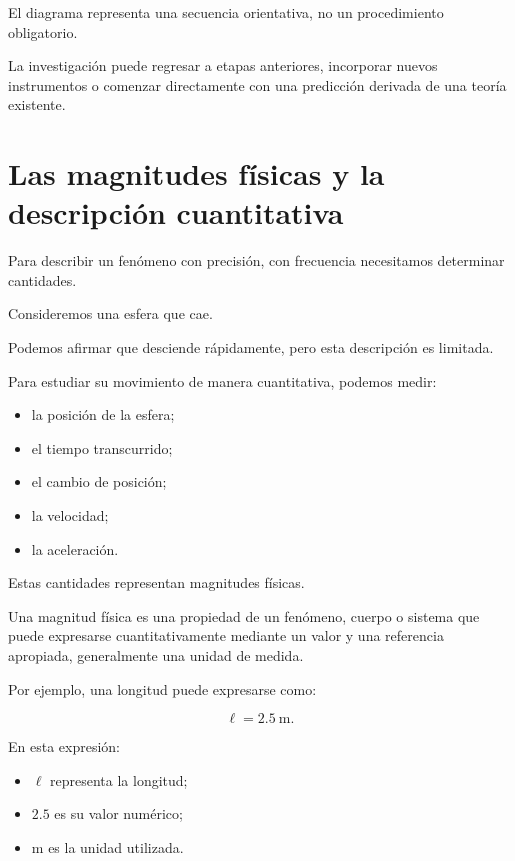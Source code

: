 \begin{observacion}

El diagrama representa una secuencia orientativa,
no un procedimiento obligatorio.

La investigación puede regresar a etapas anteriores,
incorporar nuevos instrumentos o comenzar directamente
con una predicción derivada de una teoría existente.

\end{observacion}


\section{Las magnitudes físicas y la descripción cuantitativa}

Para describir un fenómeno con precisión,
con frecuencia necesitamos determinar cantidades.

Consideremos una esfera que cae.

Podemos afirmar que desciende rápidamente,
pero esta descripción es limitada.

Para estudiar su movimiento de manera cuantitativa,
podemos medir:

\begin{itemize}
    \item la posición de la esfera;
    \item el tiempo transcurrido;
    \item el cambio de posición;
    \item la velocidad;
    \item la aceleración.
\end{itemize}

Estas cantidades representan magnitudes físicas.

\begin{definicion}

Una magnitud física es una propiedad de un fenómeno,
cuerpo o sistema que puede expresarse cuantitativamente
mediante un valor y una referencia apropiada,
generalmente una unidad de medida.

\end{definicion}

Por ejemplo, una longitud puede expresarse como:

\[\ell=\SI{2.5}{\meter}.\]

En esta expresión:

\begin{itemize}
    \item \(\ell\) representa la longitud;
    \item \(2.5\) es su valor numérico;
    \item \(\si{\meter}\) es la unidad utilizada.
\end{itemize}

